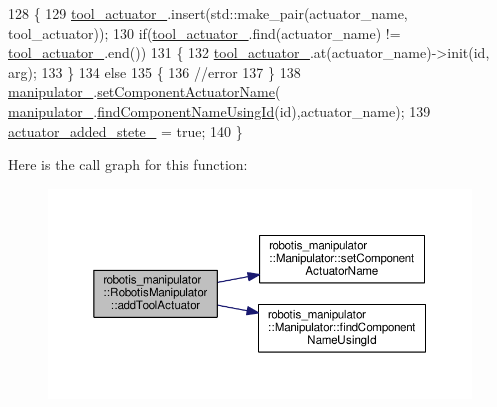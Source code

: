 \begin{DoxyCode}
128 \{
129   \hyperlink{classrobotis__manipulator_1_1_robotis_manipulator_a9d472875a989092466257d14dff2bdcf}{tool\_actuator\_}.insert(std::make\_pair(actuator\_name, tool\_actuator));
130   \textcolor{keywordflow}{if}(\hyperlink{classrobotis__manipulator_1_1_robotis_manipulator_a9d472875a989092466257d14dff2bdcf}{tool\_actuator\_}.find(actuator\_name) != \hyperlink{classrobotis__manipulator_1_1_robotis_manipulator_a9d472875a989092466257d14dff2bdcf}{tool\_actuator\_}.end())
131   \{
132     \hyperlink{classrobotis__manipulator_1_1_robotis_manipulator_a9d472875a989092466257d14dff2bdcf}{tool\_actuator\_}.at(actuator\_name)->init(\textcolor{keywordtype}{id}, arg);
133   \}
134   \textcolor{keywordflow}{else}
135   \{
136     \textcolor{comment}{//error}
137   \}
138   \hyperlink{classrobotis__manipulator_1_1_robotis_manipulator_a5b2df4a3b3ee7f408cb1d0eaf61644dc}{manipulator\_}.\hyperlink{classrobotis__manipulator_1_1_manipulator_a27e5f2bca0da521334d59600134bd28b}{setComponentActuatorName}(
      \hyperlink{classrobotis__manipulator_1_1_robotis_manipulator_a5b2df4a3b3ee7f408cb1d0eaf61644dc}{manipulator\_}.\hyperlink{classrobotis__manipulator_1_1_manipulator_a9f8406b7a5be743cc2dfc29a9f7ea647}{findComponentNameUsingId}(\textcolor{keywordtype}{id}),actuator\_name);
139   \hyperlink{classrobotis__manipulator_1_1_robotis_manipulator_a02073b7982b992642b28acfa35a17769}{actuator\_added\_stete\_} = \textcolor{keyword}{true};
140 \}
\end{DoxyCode}


Here is the call graph for this function\+:\nopagebreak
\begin{figure}[H]
\begin{center}
\leavevmode
\includegraphics[width=350pt]{classrobotis__manipulator_1_1_robotis_manipulator_a88f0868c117783b630779270875793bd_cgraph}
\end{center}
\end{figure}


